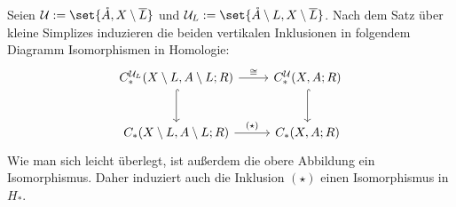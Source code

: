 \begin{beweis}[{name={des Ausschneidungssatzes}}]
	Seien $\mathcal{U} := \set{\mathring{A},X \setminus \overline{L}}$ und $\mathcal{U}_L := \set{\mathring{A} \setminus L, X \setminus \overline{L}}$. 
	Nach dem Satz über kleine Simplizes induzieren die beiden vertikalen Inklusionen in folgendem Diagramm Isomorphismen in Homologie:
	\[
		\begin{tikzcd}[row sep=large]
			C_*^{\mathcal{U}_L} \enbrace*{X \setminus L, A \setminus L;R} \rar["\cong"] \dar[hook]
			& C_*^\mathcal{U}(X,A;R) \dar[hook] \\
			C_*(X \setminus L, A \setminus L;R) \rar["(\star)"] & C_*(X,A;R)
		\end{tikzcd}
	\]
	Wie man sich leicht überlegt, ist außerdem die obere Abbildung ein Isomorphismus.
	Daher induziert auch die Inklusion $(\star)$ einen Isomorphismus in $H_*$.
\end{beweis}

